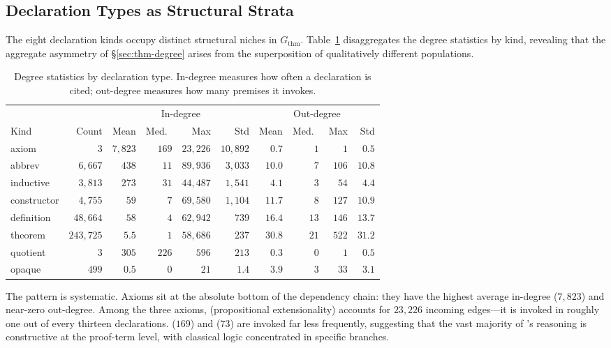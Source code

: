 \subsection{Declaration Types as Structural Strata}
\label{sec:thm-types}

The eight declaration kinds occupy distinct structural niches in $G_{\mathrm{thm}}$. Table~\ref{tab:thm-kind-degree} disaggregates the degree statistics by kind, revealing that the aggregate asymmetry of \S\ref{sec:thm-degree} arises from the superposition of qualitatively different populations.

\begin{table}[ht]
\centering
\caption{Degree statistics by declaration type. In-degree measures how often a declaration is cited; out-degree measures how many premises it invokes.}
\label{tab:thm-kind-degree}
\small
\begin{tabular}{lrrrrrrrrr}
\toprule
& & \multicolumn{4}{c}{In-degree} & \multicolumn{4}{c}{Out-degree} \\
\cmidrule(lr){3-6} \cmidrule(lr){7-10}
Kind & Count & Mean & Med.\ & Max & Std & Mean & Med.\ & Max & Std \\
\midrule
axiom       & $3$       & $7{,}823$ & $169$ & $23{,}226$ & $10{,}892$ & $0.7$ & $1$ & $1$ & $0.5$ \\
abbrev      & $6{,}667$ & $438$     & $11$  & $89{,}936$ & $3{,}033$  & $10.0$ & $7$ & $106$ & $10.8$ \\
inductive   & $3{,}813$ & $273$     & $31$  & $44{,}487$ & $1{,}541$  & $4.1$ & $3$ & $54$ & $4.4$ \\
constructor & $4{,}755$ & $59$      & $7$   & $69{,}580$ & $1{,}104$  & $11.7$ & $8$ & $127$ & $10.9$ \\
definition  & $48{,}664$& $58$      & $4$   & $62{,}942$ & $739$      & $16.4$ & $13$ & $146$ & $13.7$ \\
theorem     & $243{,}725$& $5.5$   & $1$   & $58{,}686$ & $237$      & $30.8$ & $21$ & $522$ & $31.2$ \\
quotient    & $3$       & $305$     & $226$ & $596$      & $213$      & $0.3$ & $0$ & $1$ & $0.5$ \\
opaque      & $499$     & $0.5$     & $0$   & $21$       & $1.4$      & $3.9$ & $3$ & $33$ & $3.1$ \\
\bottomrule
\end{tabular}
\end{table}

The pattern is systematic. Axioms sit at the absolute bottom of the dependency chain: they have the highest average in-degree ($7{,}823$) and near-zero out-degree. Among the three axioms,  (propositional extensionality) accounts for $23{,}226$ incoming edges---it is invoked in roughly one out of every thirteen declarations.  ($169$) and  ($73$) are invoked far less frequently, suggesting that the vast majority of 's reasoning is constructive at the proof-term level, with classical logic concentrated in specific branches.

